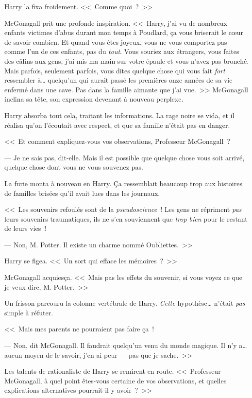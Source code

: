 Harry la fixa froidement. <<~Comme quoi~?~>>

McGonagall prit une profonde inspiration. <<~Harry, j'ai vu de nombreux enfants victimes d'abus durant mon temps à Poudlard, ça vous briserait le cœur de savoir combien. Et quand vous êtes joyeux, vous ne vous comportez pas comme l'un de ces enfants, pas du \emph{tout}. Vous souriez aux étrangers, vous faites des câlins aux gens, j'ai mis ma main sur votre épaule et vous n'avez pas bronché. Mais parfois, seulement parfois, vous dites quelque chose qui vous fait \emph{fort} ressembler à… quelqu'un qui aurait passé les premières onze années de sa vie enfermé dans une cave. Pas dans la famille aimante que j'ai vue.~>> McGonagall inclina sa tête, son expression devenant à nouveau perplexe.

Harry absorba tout cela, traitant les informations. La rage noire se vida, et il réalisa qu'on l'écoutait avec respect, et que sa famille n'était pas en danger.

<<~Et comment expliquez-vous vos observations, Professeur McGonagall~?

--- Je ne sais pas, dit-elle. Mais il est possible que quelque chose vous soit arrivé, quelque chose dont vous ne vous souvenez pas.

La furie monta à nouveau en Harry. Ça ressemblait beaucoup trop aux histoires de familles brisées qu'il avait lues dans les journaux.

<<~Les souvenirs refoulés sont de la \emph{pseudoscience}~! Les gens ne répriment \emph{pas} leurs souvenirs traumatiques, ils ne s'en souviennent que \emph{trop bien} pour le restant de leurs vies~!

--- Non, M. Potter. Il existe un charme nommé Oubliettes.~>>

Harry se figea. <<~Un sort qui efface les mémoires~?~>>

McGonagall acquiesça. <<~Mais pas les effets du souvenir, si vous voyez ce que je veux dire, M. Potter.~>>

Un frisson parcouru la colonne vertébrale de Harry. \emph{Cette} hypothèse… n'était \emph{pas} simple à réfuter.

<<~Mais mes parents ne pourraient pas faire ça~!

--- Non, dit McGonagall. Il faudrait quelqu'un venu du monde magique. Il n'y a… aucun moyen de le savoir, j'en ai peur — pas que je sache.~>>

Les talents de rationaliste de Harry se remirent en route. <<~Professeur McGonagall, à quel point êtes-vous certaine de vos observations, et quelles explications alternatives pourrait-il y avoir~?~>>

